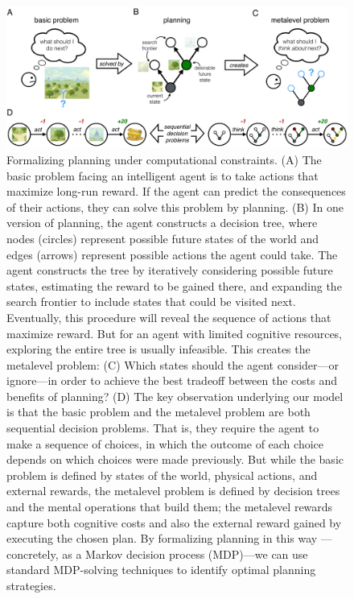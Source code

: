 \begin{figure}[ht]
    \centering
    \includegraphics[width=\textwidth]{figs/planning/fig1.pdf}
    \caption{Formalizing planning under computational constraints.
      (A) The basic problem facing an intelligent agent is to take actions that maximize long-run reward. If the agent can predict the consequences of their actions, they can solve this problem by planning.
      (B) In one version of planning, the agent constructs a decision tree, where nodes (circles) represent possible future states of the world and edges (arrows) represent possible actions the agent could take. The agent constructs the tree by iteratively considering possible future states, estimating the reward to be gained there, and expanding the search frontier to include states that could be visited next. 
      Eventually, this procedure will reveal the sequence of actions that maximize reward. But for an agent with limited cognitive resources, exploring the entire tree is usually infeasible. 
      This creates the metalevel problem:
      (C) Which states should the agent consider---or ignore---in order to achieve the best tradeoff between the costs and benefits of planning?
      (D) The key observation underlying our model is that the basic problem and the metalevel problem are both sequential decision problems. 
      That is, they require the agent to make a sequence of choices, in which the outcome of each choice depends on which choices were made previously. 
      But while the basic problem is defined by states of the world, physical actions, and external rewards, the metalevel problem is defined by decision trees and the mental operations that build them; the metalevel rewards capture both cognitive costs and also the external reward gained by executing the chosen plan. By formalizing planning in this way
      ---concretely, as a Markov decision process (MDP)---we can use standard MDP-solving techniques to identify optimal planning strategies.
    }
    \label{fig:planning-model}
\end{figure}

